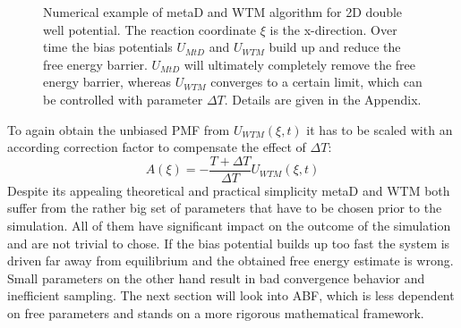 \begin{figure}[H]
    \centering
    \caption{Numerical example of metaD and WTM algorithm for 2D double well potential. The reaction coordinate $\xi$ is the x-direction. Over time the bias potentials $U_{MtD}$ and $U_{WTM}$ build up and reduce the free energy barrier. $U_{MtD}$ will ultimately completely remove the free energy barrier, whereas $U_{WTM}$ converges to a certain limit, which can be controlled with parameter $\Delta T$. Details are given in the Appendix.}
\label{fig:metaD}%
\end{figure}

To again obtain the unbiased PMF from $U_{WTM}(\xi,t)$ it has to be scaled with an according correction factor to compensate the effect of $\Delta T$:
\begin{equation}
A(\xi) = -\frac{T+\Delta T}{\Delta T}U_{WTM}(\xi, t)
\end{equation}
Despite its appealing theoretical and practical simplicity metaD and WTM both suffer from the rather big set of parameters that have to be chosen prior to the simulation. All of them have significant impact on the outcome of the simulation and are not trivial to chose. If the bias potential builds up too fast the system is driven far away from equilibrium and the obtained free energy estimate is wrong. Small parameters on the other hand result in bad convergence behavior and inefficient sampling.\autocite{laio2005assessing}
The next section will look into ABF, which is less dependent on free parameters and stands on a more rigorous mathematical framework.

